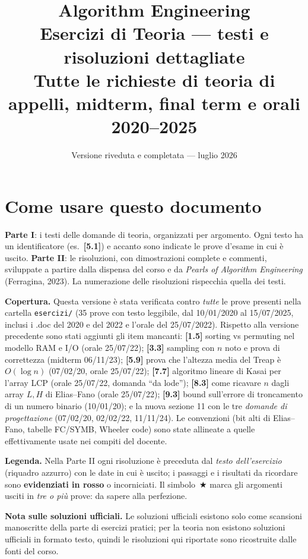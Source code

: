 \documentclass[11pt,a4paper]{article}
\title{\textbf{Algorithm Engineering}\\[2mm]
\Large Esercizi di Teoria --- testi e risoluzioni dettagliate\\[1mm]
\normalsize Tutte le richieste di teoria di appelli, midterm, final term e orali 2020--2025}
\author{}
\date{Versione riveduta e completata --- luglio 2026}
\newcommand{\qid}[1]{\textbf{[#1]}}
\newcommand{\OO}[1]{O\!\left(#1\right)}
\newcommand{\kw}[1]{\ifmmode{\color{red!60!black}#1}\else\textcolor{red!60!black}{\textbf{#1}}\fi}
\newcommand{\hot}{\,\textcolor{orange!85!black}{$\bigstar$}}
\begin{document}
\maketitle
\vspace{-1.2cm}

\section*{Come usare questo documento}

\textbf{Parte I}: i testi delle domande di teoria, organizzati per argomento. Ogni testo ha un
identificatore (es.\ \qid{5.1}) e accanto sono indicate le prove d'esame in cui \`e uscito.
\textbf{Parte II}: le risoluzioni, con dimostrazioni complete e commenti, sviluppate a partire
dalla dispensa del corso e da \emph{Pearls of Algorithm Engineering} (Ferragina, 2023).
La numerazione delle risoluzioni rispecchia quella dei testi.

\textbf{Copertura.} Questa versione \`e stata verificata contro \emph{tutte} le prove presenti
nella cartella \texttt{esercizi/} (35 prove con testo leggibile, dal 10/01/2020 al 15/07/2025,
inclusi i .doc del 2020 e del 2022 e l'orale del 25/07/2022). Rispetto alla versione precedente
sono stati aggiunti gli item mancanti:
\qid{1.5} sorting vs permuting nel modello RAM e I/O (orale 25/07/22);
\qid{3.3} sampling con $n$ noto e prova di correttezza (midterm 06/11/23);
\qid{5.9} prova che l'altezza media del Treap \`e $\OO{\log n}$ (07/02/20, orale 25/07/22);
\qid{7.7} algoritmo lineare di Kasai per l'array LCP (orale 25/07/22, domanda ``da lode'');
\qid{8.3} come ricavare $n$ dagli array $L,H$ di Elias--Fano (orale 25/07/22);
\qid{9.3} bound sull'errore di troncamento di un numero binario (10/01/20);
e la nuova sezione 11 con le tre \emph{domande di progettazione} (07/02/20, 02/02/22, 11/11/24).
Le convenzioni (bit alti di Elias--Fano, tabelle FC/SYMB, Wheeler code) sono state allineate a
quelle effettivamente usate nei compiti del docente.

\textbf{Legenda.} Nella Parte II ogni risoluzione \`e preceduta dal \emph{testo dell'esercizio}
(riquadro azzurro) con le date in cui \`e uscito; i passaggi e i risultati da ricordare sono
\kw{evidenziati in rosso} o incorniciati. Il simbolo \hot{} marca gli argomenti usciti in
\emph{tre o pi\`u} prove: da sapere alla perfezione.

\textbf{Nota sulle soluzioni ufficiali.} Le soluzioni ufficiali esistono solo come scansioni
manoscritte della parte di esercizi pratici; per la teoria non esistono soluzioni ufficiali in
formato testo, quindi le risoluzioni qui riportate sono ricostruite dalle fonti del corso.
\end{document}
